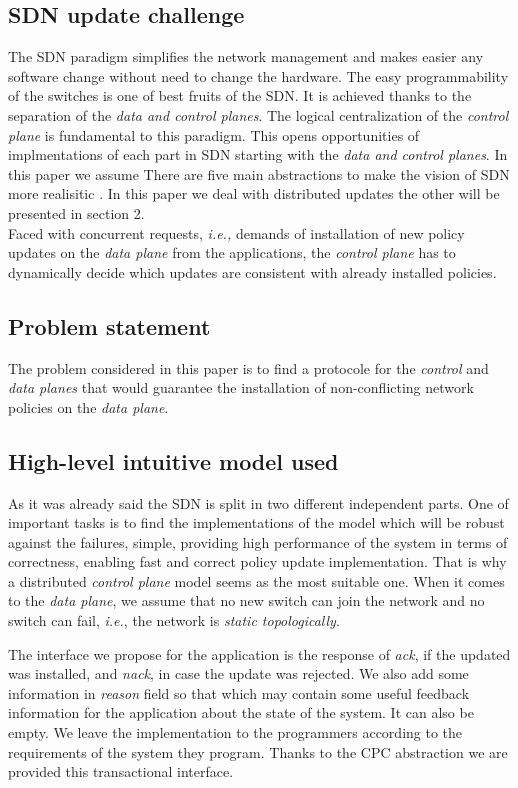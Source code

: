 \documentclass{article}
\begin{document}
\subsection{ SDN update challenge}
The SDN paradigm simplifies the network management and makes easier any software change without need to change the hardware. The easy programmability of the switches is one of best fruits of the SDN. It is achieved thanks to the separation of the \emph{data and control planes}. The logical centralization of the \emph{control plane} is fundamental to this paradigm. 
This opens opportunities of implmentations of each part in SDN starting with the \emph{data and control planes}.
In this paper we assume 
There are five main abstractions to make the vision of SDN more realisitic\cite{Casado:2014:ASN:2661061.2661063} . In this paper we deal with distributed updates the other will be presented in section 2.\\ 
Faced with concurrent requests, \emph{i.e.,} demands of installation of new policy updates on the \emph{data plane}  from the applications, the \emph{control plane} has to dynamically decide which updates are consistent with already installed policies.
\subsection{Problem statement}
The problem considered in this paper is to find a protocole for the \emph{control} and \emph{data planes} that would guarantee the installation of non-conflicting network policies on the \emph{data plane}. 
\subsection{High-level intuitive model used}
As it was already said the SDN is split in two different independent parts. One of important tasks is to find the implementations of the model which will be robust against the failures, simple, providing high performance of the system in terms of correctness, enabling fast and correct policy update implementation.
That is why a distributed \emph{control plane} model seems as the most suitable one. When it comes to the \emph{data plane}, we assume that no new switch can join the network and no switch can fail, \emph{i.e.}, the network is \emph{static topologically}. 
  
The interface we propose for the application is the response of \emph{ack}, if the updated was installed, and \emph{nack}, in case the update was rejected. We also add some information in \emph{reason} field so that which may contain some useful feedback information for the application about the state of the system. It can also be empty. We leave the implementation to the programmers according to the requirements of the system they program.
Thanks to the CPC abstraction we are provided this transactional interface.
\end{document}
